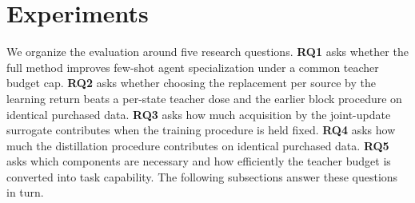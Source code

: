 \section{Experiments}\label{sec:experiments}


We organize the evaluation around five research questions.
\textbf{RQ1} asks whether the full method improves few-shot agent
specialization under a common teacher budget cap. \textbf{RQ2} asks
whether choosing the replacement per source by the learning return
beats a per-state teacher dose and the earlier block procedure on
identical purchased data. \textbf{RQ3} asks how
much acquisition by the joint-update surrogate contributes when the
training procedure is held fixed. \textbf{RQ4} asks how much the
distillation procedure contributes on identical purchased data.
\textbf{RQ5} asks which components are necessary and how efficiently
the teacher budget is converted into task capability. The following
subsections answer these questions in turn.

